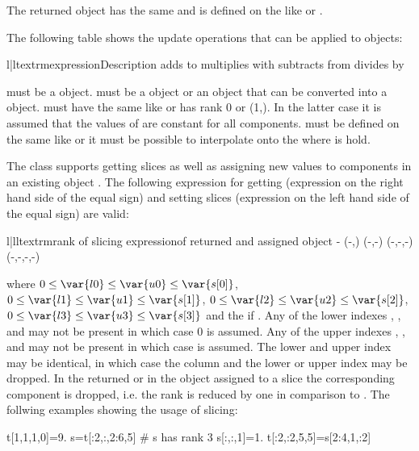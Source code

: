 The returned \Data object has the same \Shape and is defined on
the \DataSamplePoints like  or .

The following table shows the update operations that can be applied to
\Data objects:
\begin{tableii}{l|l}{textrm}{expression}{Description}
 {adds  to  \index{+}}
 {multiplies  with  \index{*}}
 {subtracts  from \index{-}}
 {divides  by  \index{/}}
\end{tableii}
 must be a \Data object.  must be a
\Data object or an object that can be converted into a
\Data object.  must have the same \Shape like
 or has rank 0 or \Shape (1,).  In the latter case it is
assumed that the values of  are constant for all
components.  must be defined on the same \DataSamplePoints like
 or it must be possible to interpolate  onto the
\DataSamplePoints where  is hold.

The \Data class supports getting slices as well as assigning new values to components in an existing
\Data object .
The following expression for getting (expression on the right hand side of the
equal sign) and setting slices (expression on the left hand side of the
equal sign) are valid:
\begin{tableiii}{l|ll}{textrm}{rank of }{slicing expression}{\Shape of returned and assigned object}
                      {-}
                   {(-,)}
             {(-,-)}
      {(-,-,-)}
 {(-,-,-,-)}
\end{tableiii}
where 
$0 \le \var{l0} \le \var{u0} \le \var{s[0]}$,
$0 \le \var{l1} \le \var{u1} \le \var{s[1]}$, 
$0 \le \var{l2} \le \var{u2} \le \var{s[2]}$, 
$0 \le \var{l3} \le \var{u3} \le \var{s[3]}$ and  the \Shape if . 
Any of the lower indexes , ,  and  may not be present in which case 
$0$ is assumed. 
Any of the upper indexes , ,  and  may not be present in which case 
 is assumed. The lower and upper index may be identical, in which case the column and the lower or upper
index may be dropped. In the returned or in the object assigned to a slice the corresponding component is dropped,
i.e. the rank is reduced by one in comparison to .
The follwing examples showing the usage of slicing:  
\begin{python}
t[1,1,1,0]=9.
s=t[:2,:,2:6,5] # s has rank 3
s[:,:,1]=1.
t[:2,:2,5,5]=s[2:4,1,:2]
\end{python}



